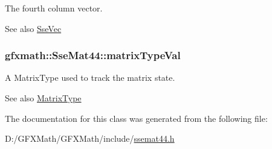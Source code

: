 The fourth column vector. 

\begin{DoxySeeAlso}{See also}
\hyperlink{namespacegfxmath_a0de2243e2b8d0fd46d3af5e036423004}{Sse\+Vec} 
\end{DoxySeeAlso}
\hypertarget{classgfxmath_1_1_sse_mat44_abdcc4efbf8375bae103da12c0823a85c}{}
\subsubsection[{matrix\+Type\+Val}]{ gfxmath\+::\+Sse\+Mat44\+::matrix\+Type\+Val}\label{classgfxmath_1_1_sse_mat44_abdcc4efbf8375bae103da12c0823a85c}


A Matrix\+Type used to track the matrix state. 

\begin{DoxySeeAlso}{See also}
\hyperlink{group___s_i_s_d_mat_math_ga6c8951c82aec5015dd6806affb4c8d03}{Matrix\+Type} 
\end{DoxySeeAlso}


The documentation for this class was generated from the following file\+:\begin{DoxyCompactItemize}
\item 
D\+:/\+G\+F\+X\+Math/\+G\+F\+X\+Math/include/\hyperlink{ssemat44_8h}{ssemat44.\+h}\end{DoxyCompactItemize}
